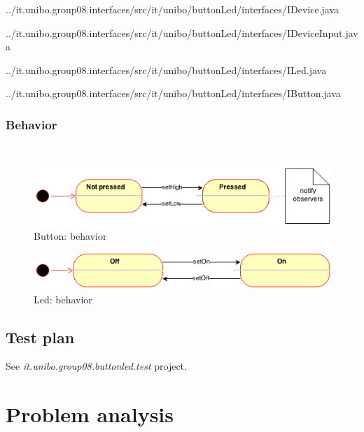 \documentclass{article}
\newcommand{\labelsec}[1]{\label{sec:#1}}
\begin{document}
  
  {../it.unibo.group08.interfaces/src/it/unibo/buttonLed/interfaces/IDevice.java}    
  
  
  {../it.unibo.group08.interfaces/src/it/unibo/buttonLed/interfaces/IDeviceInput.java}    
        
  
  {../it.unibo.group08.interfaces/src/it/unibo/buttonLed/interfaces/ILed.java}

  
  {../it.unibo.group08.interfaces/src/it/unibo/buttonLed/interfaces/IButton.java}


\subsubsection{Behavior}\\

\begin{figure}[H]
    \centering
     \includegraphics[scale=0.65]{img/ISS-FSM-Button.png}
    \caption{Button: behavior}
\end{figure}

\begin{figure}[H]
    \centering
     \includegraphics[scale=0.65]{img/ISS-FSM-Led.png}
    \caption{Led: behavior}
\end{figure}


\subsection{Test plan}

 See \emph{it.unibo.group08.buttonled.test} project.

\section{Problem analysis}
\labelsec{ProblemAnalysis}
\end{document}
